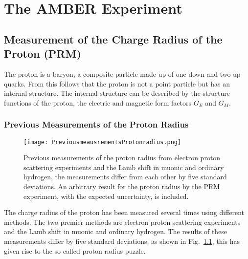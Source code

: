 \chapter{The AMBER Experiment}\label{cha:theory}

\noindent
\section{Measurement of the Charge Radius of the Proton (PRM)}\label{sec:proton_radius}
The proton is a baryon, a composite particle made up of one down and two up quarks.
From this follows that the proton is not a point particle but has an internal structure\autocite{Workman:2836514}.
\newline
The internal structure can be described by the structure functions of the proton, 
the electric and magnetic form factors $G_E$ and $G_M$\autocite{ProposalAmber}.	
\subsection{Previous Measurements of the Proton Radius}
\begin{figure}[h]
	\centering
	\texttt{[image: PreviousmeausrementsProtonradius.png]}
	\caption{Previous measurements of the proton radius from electron proton scattering experiments and the Lamb shift in muonic and ordinary hydrogen,
	 the measurements differ from each other by five standard deviations. An arbitrary result for the proton radius by the PRM experiment, with the expected uncertainty, is included.\autocite{ProposalAmber} }
	\label{fig:previous_proton_radius}
\end{figure}

The charge radius of the proton has been measured several times using different methods.
The two premier methods are electron proton scattering experiments and the Lamb shift in muonic and ordinary hydrogen.
The results of these measurements differ by five standard deviations, as shown in Fig.~\ref{fig:previous_proton_radius},
this has given rise to the so called proton radius puzzle\autocite{ProposalAmber}.

